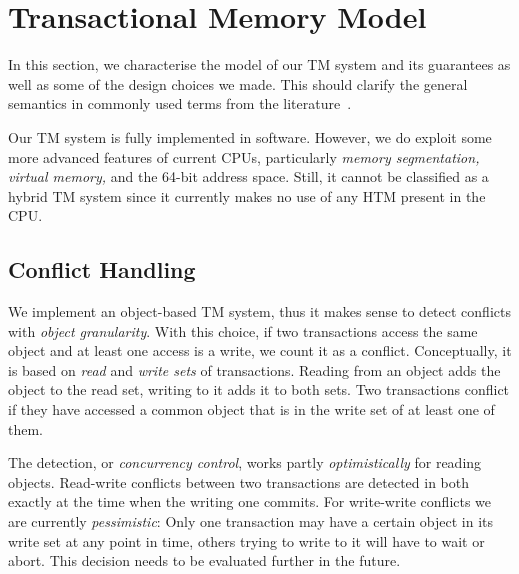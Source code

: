 \documentclass{sigplanconf}
\begin{document}



\section{Transactional Memory Model}

In this section, we characterise the model of our TM system and its
guarantees as well as some of the design choices we made. This should
clarify the general semantics in commonly used terms from the
literature~\cite{harris10}.

Our TM system is fully implemented in software. However, we do exploit
some more advanced features of current CPUs, particularly \emph{memory
segmentation, virtual memory,} and the 64-bit address space. Still,
it cannot be classified as a hybrid TM system since it currently
makes no use of any HTM present in the CPU.

\subsection{Conflict Handling}

We implement an object-based TM system, thus it makes sense to detect
conflicts with \emph{object granularity}. With this choice, if two
transactions access the same object and at least one access is a
write, we count it as a conflict. Conceptually, it is based on
\emph{read} and \emph{write sets} of transactions. Reading from an
object adds the object to the read set, writing to it adds it to both
sets. Two transactions conflict if they have accessed a common object
that is in the write set of at least one of them.

The detection, or \emph{concurrency control}, works partly
\emph{optimistically} for reading objects. Read-write conflicts
between two transactions are detected in both exactly at the time when
the writing one commits. For write-write conflicts we are currently
\emph{pessimistic}: Only one transaction may have a certain object in
its write set at any point in time, others trying to write to it will
have to wait or abort. This decision needs to be evaluated further
in the future.
\end{document}
